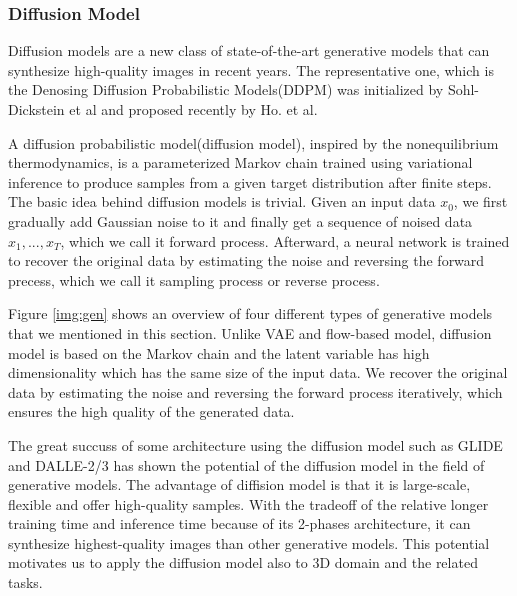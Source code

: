\documentclass[12pt,DIV14,BCOR12mm,a4paper,footinclude=false,headinclude,parskip=half-,twoside,openright,cleardoublepage=empty,toc=index,bibliography=totoc,listof=totoc]{scrreprt}
\numberwithin{equation}{chapter}
\begin{document}
\subsubsection{Diffusion Model}
Diffusion models are a new class of state-of-the-art generative models that can synthesize high-quality images in recent years. The representative one, which is the Denosing Diffusion Probabilistic Models(DDPM) was initialized by Sohl-Dickstein et al\cite{sohldickstein2015deep} and proposed recently by Ho. et al\cite{ho2020denoising}. 

A diffusion probabilistic model(diffusion model), inspired by the nonequilibrium thermodynamics, is a parameterized Markov chain trained using variational inference to produce samples from a given target distribution after finite steps. The basic idea behind diffusion models is trivial. Given an input data $x_{0}$, we first gradually add Gaussian noise to it and finally get a sequence of noised data $x_{1},...,x_{T}$, which we call it forward process. Afterward, a neural network is trained to recover the original data by estimating the noise and reversing the forward precess, which we call it sampling process or reverse process.

Figure \ref{img:gen} shows an overview of four different types of generative models that we mentioned in this section. Unlike VAE and flow-based model, diffusion model is based on the Markov chain and the latent variable has high dimensionality which has the same size of the input data. We recover the original data by estimating the noise and reversing the forward process iteratively, which ensures the high quality of the generated data.

The great succuss of some architecture using the diffusion model such as GLIDE\cite{nichol2022glide} and DALLE-2/3\cite{ramesh2022hierarchical} has shown the potential of the diffusion model in the field of generative models. The advantage of diffision model is that it is large-scale, flexible and offer high-quality samples. With the tradeoff of the relative longer training time and inference time because of its 2-phases architecture, it can synthesize highest-quality images than other generative models. This potential motivates us to apply the diffusion model also to 3D domain and the related tasks.
\end{document}
